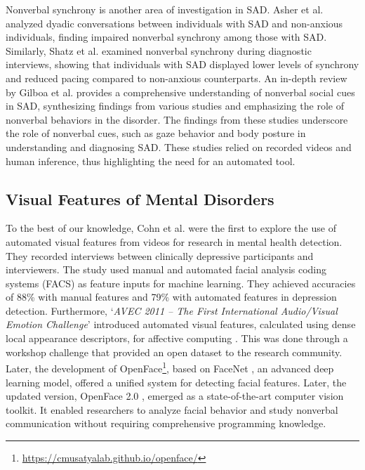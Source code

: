 Nonverbal synchrony is another area of investigation in SAD. Asher et al. \cite{asher2020out} analyzed dyadic conversations between individuals with SAD and non-anxious individuals, finding impaired nonverbal synchrony among those with SAD. Similarly, Shatz et al. \cite{shatz2024nonverbal} examined nonverbal synchrony during diagnostic interviews, showing that individuals with SAD displayed lower levels of synchrony and reduced pacing compared to non-anxious counterparts. An in-depth review by Gilboa et al. \cite{gilboa2013more} provides a comprehensive understanding of nonverbal social cues in SAD, synthesizing findings from various studies and emphasizing the role of nonverbal behaviors in the disorder. The findings from these studies underscore the role of nonverbal cues, such as gaze behavior and body posture in understanding and diagnosing SAD. These studies relied on recorded videos and human inference, thus highlighting the need for an automated tool.

\subsection{Visual Features of Mental Disorders}
To the best of our knowledge, Cohn et al. \cite{cohn2009detecting} were the first to explore the use of automated visual features from videos for research in mental health detection. They recorded interviews between clinically depressive participants and interviewers. The study used manual and automated facial analysis coding systems (FACS) as feature inputs for machine learning. They achieved accuracies of 88\% with manual features and 79\% with automated features in depression detection. Furthermore, `\textit{AVEC 2011 – The First International Audio/Visual Emotion Challenge}' introduced automated visual features, calculated using dense local appearance descriptors, for affective computing \cite{schuller2011avec}. This was done through a workshop challenge that provided an open dataset to the research community. Later, the development of OpenFace\footnote{\url{https://cmusatyalab.github.io/openface/}}, based on FaceNet \cite{schroff2015facenet}, an advanced deep learning model, offered a unified system for detecting facial features. Later, the updated version, OpenFace 2.0 \cite{baltruvsaitis2016openface}, emerged as a state-of-the-art computer vision toolkit. It enabled researchers to analyze facial behavior and study nonverbal communication without requiring comprehensive programming knowledge.

